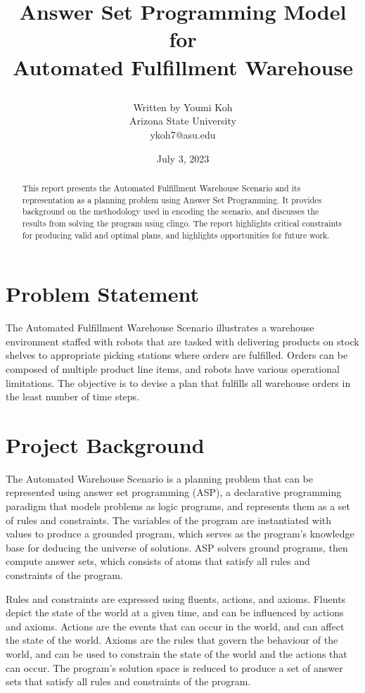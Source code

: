 \documentclass[letterpaper]{article}
\title{

    Answer Set Programming Model for \\
    Automated Fulfillment Warehouse\\


}
\author{
    Written by Youmi Koh \\
    Arizona State University \\
    ykoh7@asu.edu
}
\date{July 3, 2023}
\begin{document}
\maketitle

\begin{abstract}
This report presents the Automated Fulfillment Warehouse Scenario and its representation as a planning problem using Answer Set Programming. It provides background on the methodology used in encoding the scenario, and discusses the results from solving the program using clingo. The report highlights critical constraints for producing valid and optimal plans, and highlights opportunities for future work.
\end{abstract}

\section{Problem Statement}

\noindent The Automated Fulfillment Warehouse Scenario illustrates a warehouse environment staffed with robots that are tasked with delivering products on stock shelves to appropriate picking stations where orders are fulfilled. Orders can be composed of multiple product line items, and robots have various operational limitations. The objective is to devise a plan that fulfills all warehouse orders in the least number of time steps.


\section{Project Background}

\noindent The Automated Warehouse Scenario is a planning problem that can be represented using answer set programming (ASP), a declarative programming paradigm that models problems as logic programs, and represents them as a set of rules and constraints. The variables of the program are instantiated with values to produce a grounded program, which serves as the program's knowledge base for deducing the universe of solutions. ASP solvers ground programs, then compute answer sets, which consists of atoms that satisfy all rules and constraints of the program.

Rules and constraints are expressed using fluents, actions, and axioms. Fluents depict the state of the world at a given time, and can be influenced by actions and axioms. Actions are the events that can occur in the world, and can affect the state of the world. Axioms are the rules that govern the behaviour of the world, and can be used to constrain the state of the world and the actions that can occur. The program's solution space is reduced to produce a set of answer sets that satisfy all rules and constraints of the program.
\end{document}
